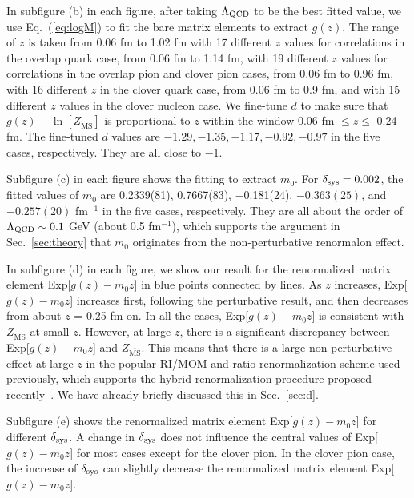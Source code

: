 In subfigure (b) in each figure, after taking $\Lambda_{\rm QCD}$ to be the best fitted value, we use Eq.~(\ref{eq:logM}) to fit the bare matrix elements to extract $g(z)$. The range of $z$ is taken from 0.06 fm to 1.02 fm with 17 different $z$ values for correlations in the overlap quark case, from 0.06 fm to 1.14 fm, with 19 different $z$ values for correlations in the overlap pion and clover pion cases, from 0.06 fm to 0.96 fm, with 16 different $z$ in the clover quark case, from 0.06 fm to 0.9 fm, and  with 15 different $z$ values in the clover nucleon case. We fine-tune $d$ to make sure that $g(z) - \ln[Z_{\overline{\mathrm{MS}}}]$ is proportional to $z$ within the window 0.06 fm $\leq z \leq$ 0.24 fm. %
The fine-tuned $d$ values are $-1.29, -1.35, -1.17, -0.92, -0.97$ in the five cases, respectively. They are all close to $-1$. 

Subfigure (c) in each figure shows the fitting to extract $m_{0}$. For $\delta_{\rm sys}=0.002$, the fitted values of $m_{0}$ are 0.2339(81), 0.7667(83), $-$0.181(24), $-0.363(25)$, and $-0.257(20)$ fm$^{-1}$ in the five cases, respectively. They are all about the order of $\Lambda_{\rm QCD} \sim 0.1$ GeV (about 0.5 fm$^{-1}$), which supports the argument in Sec.~\ref{sec:theory} that $m_{0}$ originates from the non-perturbative renormalon effect. 

In subfigure (d) in each figure, we show our result for the renormalized matrix element Exp[$g(z)-m_{0}z$] in blue points connected by lines. As $z$ increases, Exp[$g(z)-m_{0}z$] increases first, following the perturbative result, 
and then decreases from about $z$ = 0.25 fm on. In all the cases, Exp[$g(z)-m_{0}z$] is consistent with $Z_{\overline{\mathrm{MS}}}$ at small $z$. However, at large $z$, there is a significant discrepancy between Exp[$g(z)-m_{0}z$] and $Z_{\overline{\mathrm{MS}}}$. This means that there is a large non-perturbative effect at large $z$ in the popular RI/MOM and ratio renormalization scheme used previously, which supports the hybrid renormalization procedure proposed recently~\cite{Ji:2020brr}. We have already 
briefly discussed this in Sec.~\ref{sec:d}. 

Subfigure (e) shows the renormalized matrix element Exp[$g(z)-m_{0}z$] for different $\delta_{\rm sys}$. A change in $\delta_{\rm sys}$ does not influence the central values of Exp[$g(z)-m_{0}z$] for most cases except for the clover pion. 
In the clover pion case, the increase of $\delta_{\rm sys}$ can slightly decrease the renormalized matrix element Exp[$g(z)-m_{0}z$]. 

